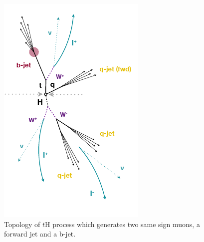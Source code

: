 	\begin{figure}[!htbp]
		\centering
		\includegraphics[scale=0.9]{Chapter1/jet.png}
		\caption{Topology of $t$H process which generates two same sign muons, a forward jet and a b-jet.} 
		\label{jet}
	\end{figure}

\pagebreak


